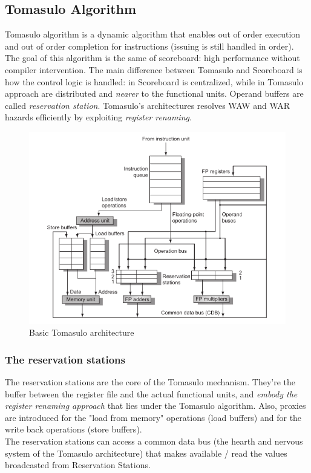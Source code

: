 \documentclass[10pt,a4paper]{article}
\begin{document}
			\subsection{Tomasulo Algorithm}
				Tomasulo algorithm is a dynamic algorithm that enables out of order execution and out of order completion for instructions (issuing is still handled in order). The goal of this algorithm is the same of scoreboard: high performance without compiler intervention. The main difference between Tomasulo and Scoreboard is how the control logic is handled: in Scoreboard is centralized, while in Tomasulo approach are distributed and \emph{nearer} to the functional units. Operand buffers are called \emph{reservation station}. Tomasulo's architectures resolves WAW and WAR hazards efficiently by exploiting \emph{register renaming}.
				\begin{figure}
					\centering
					\includegraphics[width = \textwidth]{./images/TomasuloArchitecture.png}
					\caption{Basic Tomasulo architecture}
				\end{figure}
				
				\subsubsection{The reservation stations}
					The reservation stations are the core of the Tomasulo mechanism. They're the buffer between the register file and the actual functional units, and \emph{embody the register renaming approach} that lies under the Tomasulo algorithm. Also, proxies are introduced for the "load from memory" operations (load buffers) and for the write back operations (store buffers).\\
					The reservation stations can access a common data bus (the hearth and nervous system of the Tomasulo architecture) that makes available / read the values broadcasted from Reservation Stations.
					
\end{document}
